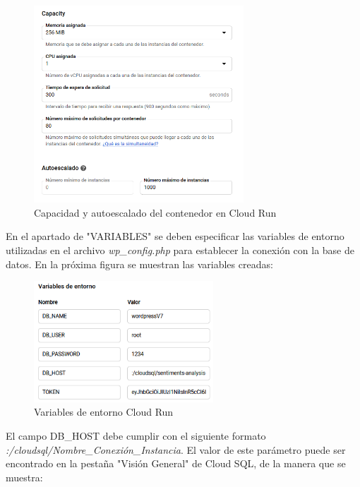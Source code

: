 \begin{figure}[ht]
    	\begin{center}
    		\includegraphics[width = 0.70\textwidth]{Figuras/CapacidadAutoescaladoCloudRun.PNG}
    	\end{center}
    	\caption{\label{fig:CapacidadCloudRun} Capacidad y autoescalado del contenedor en Cloud Run}
\end{figure}

\newpage

En el apartado de "VARIABLES" se deben especificar las variables de entorno utilizadas en el archivo \textit{wp\_config.php} para establecer la conexión con la base de datos. En la próxima figura se muestran las variables creadas:

\begin{figure}[ht]
    	\begin{center}
    		\includegraphics[width = 0.60\textwidth]{Figuras/VariablesCloudRun.PNG}
    	\end{center}
    	\caption{\label{fig:VariablesCloudRun} Variables de entorno Cloud Run}
\end{figure}

El campo DB\_HOST debe cumplir con el siguiente formato \textit{:/cloudsql/Nombre\_Conexión\_Instancia}. El valor de este parámetro puede ser encontrado en la pestaña "Visión General" de Cloud SQL, de la manera que se muestra:

